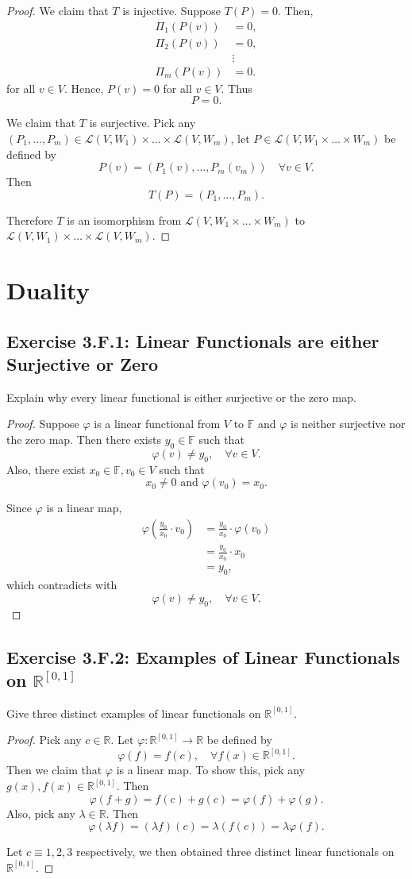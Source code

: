 \begin{proof}
We claim that $T$ is injective. Suppose $T(P)=0$. Then,\[
\begin{split}
\Pi_1(P(v))&=0,\\
\Pi_2(P(v))&=0,\\
&\vdots\\
\Pi_m(P(v))&=0.
\end{split}
\]for all $v\in V$. Hence, $P(v)=0$ for all $v\in V$. Thus\[
P=0.
\]

We claim that $T$ is surjective. Pick any $(P_1,\dots,P_m)\in\mathcal{L}(V, W_1)\times\dots\times\mathcal{L}(V,W_m)$, let $P\in\mathcal{L}(V,W_1\times\dots\times W_m)$ be defined by\[
P(v)=(P_1(v),\dots,P_m(v_m))\quad\forall v\in V.
\]Then\[
T(P)=(P_1,\dots,P_m).
\]

Therefore $T$ is an isomorphism from $\mathcal{L}(V,W_1\times\dots\times W_m)$ to $\mathcal{L}(V, W_1)\times\dots\times\mathcal{L}(V,W_m)$.
\end{proof}

\chapter{Duality}
\section{Exercise 3.F.1: Linear Functionals are either Surjective or Zero}
Explain why every linear functional is either surjective or the zero map.
\begin{proof}
Suppose $\varphi$ is a linear functional from $V$ to $\mathbb{F}$ and $\varphi$ is neither surjective nor the zero map. Then there exists $y_0\in\mathbb{F}$ such that\[
\varphi(v)\ne y_0,\quad\forall v\in V.
\]Also, there exist $x_0\in\mathbb{F}, v_0\in V$ such that\[
x_0\ne 0\text{ and }\varphi(v_0)=x_0.
\]

Since $\varphi$ is a linear map,\[
\begin{split}
\varphi(\frac{y_0}{x_0}\cdot v_0)&=\frac{y_0}{x_0}\cdot\varphi(v_0)\\
&=\frac{y_0}{x_0}\cdot x_0\\
&=y_0,
\end{split}
\]which contradicts with\[
\varphi(v)\ne y_0,\quad\forall v\in V.
\]
\end{proof}
\section{Exercise 3.F.2: Examples of Linear Functionals on $\mathbb{R}^{[0,1]}$}
Give three distinct examples of linear functionals on $\mathbb{R}^{[0,1]}$.
\begin{proof}
Pick any $c\in\mathbb{R}$. Let $\varphi:\mathbb{R}^{[0,1]}\to\mathbb{R}$ be defined by\[
\varphi(f)=f(c),\quad\forall f(x)\in\mathbb{R}^{[0,1]}.
\]Then we claim that $\varphi$ is a linear map. To show this, pick any $g(x), f(x)\in\mathbb{R}^{[0,1]}$. Then\[
\varphi(f+g)=f(c)+g(c)=\varphi(f)+\varphi(g).
\]Also, pick any $\lambda\in\mathbb{R}$. Then\[
\varphi(\lambda f)=(\lambda f)(c)=\lambda (f(c))=\lambda\varphi(f).
\]

Let $c\equiv1,2,3$ respectively, we then obtained three distinct linear functionals on $\mathbb{R}^{[0,1]}$.
\end{proof}
